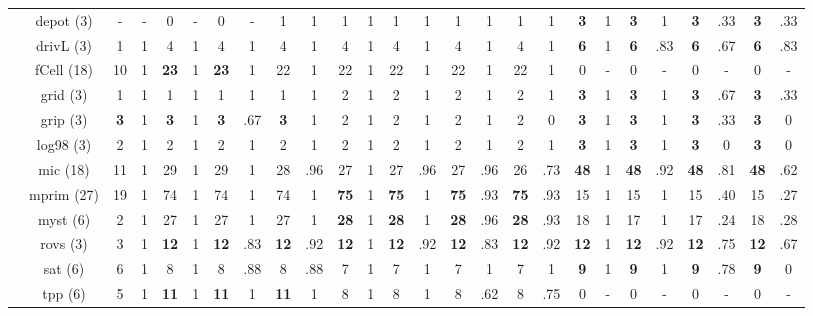 \begin{table*}
\begin{tabular}{cccccccccccccccccccccccccc}
    \multicolumn{1}{c}{} & depot (3) & - & - & 0 & - & 0 & - & 1 & 1 & 1 & 1 & 1 & 1 & 1 & 1 & 1 & 1 & \textbf{3} & 1 & \textbf{3} & 1 & \textbf{3} & .33 & \textbf{3} & .33 \\
    \multicolumn{1}{c}{} & drivL (3) & 1 & 1 & 4 & 1 & 4 & 1 & 4 & 1 & 4 & 1 & 4 & 1 & 4 & 1 & 4 & 1 & \textbf{6} & 1 & \textbf{6} & .83 & \textbf{6} & .67 & \textbf{6} & .83 \\
    \multicolumn{1}{c}{} & fCell (18) & 10 & 1 & \textbf{23} & 1 & \textbf{23} & 1 & 22 & 1 & 22 & 1 & 22 & 1 & 22 & 1 & 22 & 1 & 0 & - & 0 & - & 0 & - & 0 & - \\
    \multicolumn{1}{c}{} & grid (3) & 1 & 1 & 1 & 1 & 1 & 1 & 1 & 1 & 2 & 1 & 2 & 1 & 2 & 1 & 2 & 1 & \textbf{3} & 1 & \textbf{3} & 1 & \textbf{3} & .67 & \textbf{3} & .33 \\
    \multicolumn{1}{c}{} & grip (3) & \textbf{3} & 1 & \textbf{3} & 1 & \textbf{3} & .67 & \textbf{3} & 1 & 2 & 1 & 2 & 1 & 2 & 1 & 2 & 0 & \textbf{3} & 1 & \textbf{3} & 1 & \textbf{3} & .33 & \textbf{3} & 0 \\
    \multicolumn{1}{c}{} & log98 (3) & 2 & 1 & 2 & 1 & 2 & 1 & 2 & 1 & 2 & 1 & 2 & 1 & 2 & 1 & 2 & 1 & \textbf{3} & 1 & \textbf{3} & 1 & \textbf{3} & 0 & \textbf{3} & 0 \\
    \multicolumn{1}{c}{} & mic (18) & 11 & 1 & 29 & 1 & 29 & 1 & 28 & .96 & 27 & 1 & 27 & .96 & 27 & .96 & 26 & .73 & \textbf{48} & 1 & \textbf{48} & .92 & \textbf{48} & .81 & \textbf{48} & .62 \\
    \multicolumn{1}{c}{} & mprim (27) & 19 & 1 & 74 & 1 & 74 & 1 & 74 & 1 & \textbf{75} & 1 & \textbf{75} & 1 & \textbf{75} & .93 & \textbf{75} & .93 & 15 & 1 & 15 & 1 & 15 & .40 & 15 & .27 \\
    \multicolumn{1}{c}{} & myst (6) & 2 & 1 & 27 & 1 & 27 & 1 & 27 & 1 & \textbf{28} & 1 & \textbf{28} & 1 & \textbf{28} & .96 & \textbf{28} & .93 & 18 & 1 & 17 & 1 & 17 & .24 & 18 & .28 \\
    \multicolumn{1}{c}{} & rovs (3) & 3 & 1 & \textbf{12} & 1 & \textbf{12} & .83 & \textbf{12} & .92 & \textbf{12} & 1 & \textbf{12} & .92 & \textbf{12} & .83 & \textbf{12} & .92 & \textbf{12} & 1 & \textbf{12} & .92 & \textbf{12} & .75 & \textbf{12} & .67 \\
    \multicolumn{1}{c}{} & sat (6) & 6 & 1 & 8 & 1 & 8 & .88 & 8 & .88 & 7 & 1 & 7 & 1 & 7 & 1 & 7 & 1 & \textbf{9} & 1 & \textbf{9} & 1 & \textbf{9} & .78 & \textbf{9} & 0 \\
    \multicolumn{1}{c}{} & tpp (6) & 5 & 1 & \textbf{11} & 1 & \textbf{11} & 1 & \textbf{11} & 1 & 8 & 1 & 8 & 1 & 8 & .62 & 8 & .75 & 0 & - & 0 & - & 0 & - & 0 & - \\

\end{tabular}
\end{table*}
